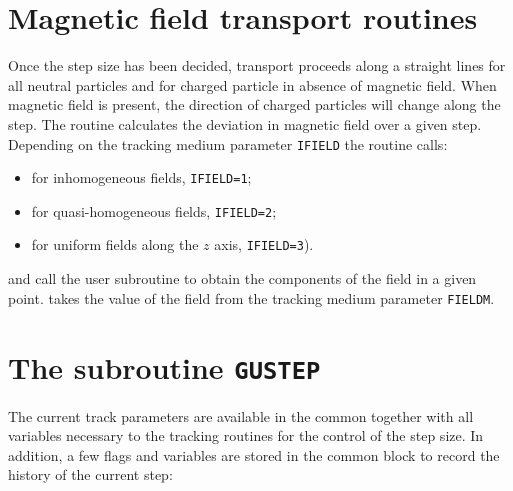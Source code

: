 \section{Magnetic field transport routines}
Once the step size has been decided, transport proceeds along a straight
lines for all neutral particles and for charged particle in absence of
magnetic field. When magnetic field is present, the direction of charged
particles will change along the step. The routine  calculates
the deviation in magnetic field over a given step. 
Depending on 
the tracking medium parameter {\tt IFIELD} the  routine
calls:
\begin{itemize}
\item {} for inhomogeneous fields, {\tt IFIELD=1};
\item {} for quasi-homogeneous fields, {\tt IFIELD=2};
\item {} for uniform fields along the $z$ axis, {\tt IFIELD=3}).
\end{itemize}
 and  call the user subroutine
 to obtain the components of the field in a given point.
 takes the value of the field from the tracking medium parameter
{\tt FIELDM}.

\section{The subroutine {\tt GUSTEP}}
 
The current track parameters are available in the common
 together with all variables necessary to 
the tracking routines for the control of the step size. In addition, a few
flags and variables are
stored in the common block  to record the history of the
current step:

